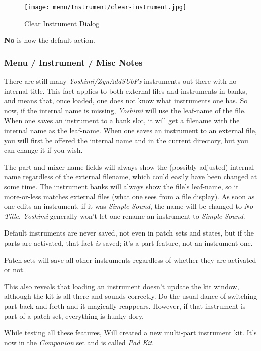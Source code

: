 \begin{figure}[H]
   \centering 
   \texttt{[image: menu/Instrument/clear-instrument.jpg]}
   \caption{Clear Instrument Dialog}
   \label{fig:clear_instrument_dialog}
\end{figure}

   \textbf{No} is now the default action.

\subsubsection{Menu / Instrument / Misc Notes}
\label{subsubsec:menu_instrument_misc_notes}

   There are still many \textsl{Yoshimi/ZynAddSUbFx} instruments out there with
   no internal title. This fact applies to both external files and instruments
   in banks, and means that, once loaded, one does not know what instruments
   one has. So now, if the internal name is missing, \textsl{Yoshimi} will use
   the leaf-name of the file.  When one saves an instrument to a bank slot, it
   will get a filename with the internal name as the leaf-name.  When one saves
   an instrument to an external file, you will first be offered the internal
   name and in the current directory, but you can change it if you wish.

   The part and mixer name fields will always show the (possibly adjusted)
   internal name regardless of the external filename, which could easily have
   been changed at some time.  The instrument banks will always show the file's
   leaf-name, so it more-or-less matches external files (what one sees from a
   file display).  As soon as one edits an instrument, if it was \textsl{Simple
   Sound}, the name will be changed to \textsl{No Title}.  \textsl{Yoshimi}
   generally won't let one rename an instrument to \textsl{Simple Sound}.

   Default instruments are never saved, not even in patch sets and states, but
   if the parts are activated, that fact \textsl{is} saved; it's a part
   feature, not an instrument one.

   Patch sets will save all other instruments regardless of whether they are
   activated or not.

   This also reveals that loading an instrument doesn't update the kit window,
   although the kit is all there and sounds correctly. Do the usual dance of
   switching part back and forth and it magically reappears. However, if that
   instrument is part of a patch set, everything is hunky-dory.

   While testing all these features, Will created a new multi-part instrument
   kit.  It's now in the \textsl{Companion} set and is called \textsl{Pad Kit}.

